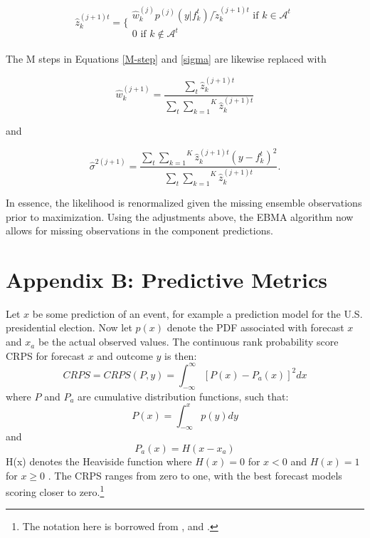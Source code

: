\documentclass[12pt,fullpage,endnotes]{article}
\begin{document}
\begin{equation}
\hat{z}^{(j+1)t}_{k} = \Bigg\{ \begin{array}{c} {\hat{w}^{(j)}_k p^{(j)}(y|f_{k}^{t})}/{\tilde{z}_k^{(j+1)t} } \mbox{ if } k \in \mathcal{A}^t\\ 0 \mbox{ if } k \notin \mathcal{A}^t \end{array}
\end{equation}



\noindent  The M steps in Equations \ref{M-step} and \ref{sigma} are likewise replaced with

\begin{equation}
\hat{w}^{(j+1)}_k=\frac{\underset{t}{\sum}\hat{z}^{(j+1)t}_{k}}{\underset{t}{\sum}\overset{K}{\underset{k=1}{ \sum}} \hat{z}_k^{(j+1)t}}
\end{equation}


\noindent and

\begin{equation}
\hat{\sigma}^{2(j+1)}=\frac{\underset{t}{\sum}\overset{K}{\underset{k=1}{\sum}}\hat{z}^{(j+1)t}_{k}(y-f_{k}^{t})^2 }{\underset{t}{\sum}\overset{K}{\underset{k=1}{ \sum}} \hat{z}_k^{(j+1)t}}.
\end{equation}

\noindent In essence, the likelihood is renormalized given the missing
ensemble observations prior to maximization. Using the adjustments
above, the EBMA algorithm now allows for missing observations in the
component predictions.



 \section*{Appendix B: Predictive Metrics}
Let $x$ be some prediction of an event, for example a prediction model for the U.S. presidential election. Now let $p(x)$ denote the PDF associated with forecast $x$ and $x_a$ be the actual observed values. The continuous rank probability score CRPS for forecast $x$ and outcome $y$ is then:
\begin{equation}
CRPS=CRPS(P,y)=\int^{\infty}_{-\infty} [P(x)-P_a(x)]^2 dx
\end{equation}
where $P$ and $P_a$ are cumulative distribution functions, such that:
\begin{equation}
P(x)=\int^{x}_{-\infty} p(y) dy
\end{equation}
and 
\begin{equation}
P_a(x)=H(x-x_a)
\end{equation}
H(x) denotes the Heaviside function where $H(x)=0$ for $x<0$ and $H(x)=1$ for $x\geq0$ \citep{Hersbach:2000}. The CRPS ranges from zero to one, with the best forecast models scoring closer to zero.\footnote{The notation here is borrowed from \citet{Hersbach:2000}, and \citet{GneitingEtAl:2007}.}
\end{document}
